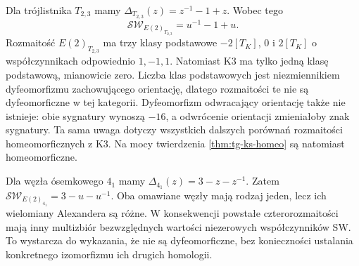 \begin{przyklad}
Dla trójlistnika $T_{2,3}$ mamy
$\Delta_{T_{2,3}}(z)=z^{-1}-1+z$. Wobec tego
\[
\mathcal{SW}_{E(2)_{T_{2,3}}}=u^{-1}-1+u.
\]
Rozmaitość $E(2)_{T_{2,3}}$ ma trzy klasy podstawowe
$-2[T_K]$, $0$ i $2[T_K]$ o współczynnikach
odpowiednio $1,-1,1$. Natomiast K3 ma tylko
jedną klasę podstawową, mianowicie zero.
Liczba klas podstawowych jest niezmiennikiem
dyfeomorfizmu zachowującego orientację, dlatego
rozmaitości te nie są dyfeomorficzne w tej kategorii.
Dyfeomorfizm odwracający orientację także nie istnieje:
obie sygnatury wynoszą $-16$, a odwrócenie
orientacji zmieniałoby znak sygnatury.
Ta sama uwaga dotyczy wszystkich dalszych porównań
rozmaitości homeomorficznych z K3. Na mocy twierdzenia
\ref{thm:tg-ks-homeo} są natomiast homeomorficzne.
\end{przyklad}

\begin{przyklad}
Dla węzła ósemkowego $4_1$ mamy
$\Delta_{4_1}(z)=3-z-z^{-1}$.
Zatem
$\mathcal{SW}_{E(2)_{4_1}}=3-u-u^{-1}$.
Oba omawiane węzły mają rodzaj jeden, lecz
ich wielomiany Alexandera są różne.
W konsekwencji powstałe czterorozmaitości mają
inny multizbiór bezwzględnych wartości niezerowych
współczynników SW. To wystarcza do wykazania,
że nie są dyfeomorficzne, bez konieczności ustalania
konkretnego izomorfizmu ich drugich homologii.
\end{przyklad}

\begin{center}
\end{center}

